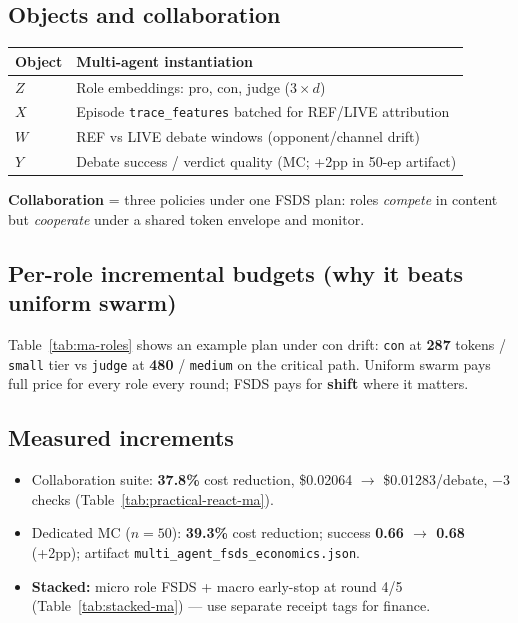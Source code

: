 \documentclass[11pt]{article}
\begin{document}
\subsection{Objects and collaboration}
\begin{center}
\begin{tabular}{@{}ll@{}}
\toprule
Object & Multi-agent instantiation \\
\midrule
$Z$ & Role embeddings: pro, con, judge ($3\times d$) \\
$X$ & Episode \texttt{trace\_features} batched for REF/LIVE attribution \\
$W$ & REF vs LIVE debate windows (opponent/channel drift) \\
$Y$ & Debate success / verdict quality (MC; +2pp in 50-ep artifact) \\
\bottomrule
\end{tabular}
\end{center}
\textbf{Collaboration} = three policies under one FSDS plan: roles \emph{compete} in content but \emph{cooperate} under a shared token envelope and monitor.

\subsection{Per-role incremental budgets (why it beats uniform swarm)}
Table~\ref{tab:ma-roles} shows an example plan under con drift: \texttt{con} at \textbf{287} tokens / \texttt{small} tier vs \texttt{judge} at \textbf{480} / \texttt{medium} on the critical path.
Uniform swarm pays full price for every role every round; FSDS pays for \textbf{shift} where it matters.

\subsection{Measured increments}
\begin{itemize}[nosep]
  \item Collaboration suite: \textbf{37.8\%} cost reduction, \$0.02064 $\rightarrow$ \$0.01283/debate, $-$3 checks (Table~\ref{tab:practical-react-ma}).
  \item Dedicated MC ($n{=}50$): \textbf{39.3\%} cost reduction; success \textbf{0.66 $\rightarrow$ 0.68} (+2pp); artifact \texttt{multi\_agent\_fsds\_economics.json}.
  \item \textbf{Stacked:} micro role FSDS + macro early-stop at round 4/5 (Table~\ref{tab:stacked-ma}) --- use separate receipt tags for finance.
\end{itemize}
\end{document}
